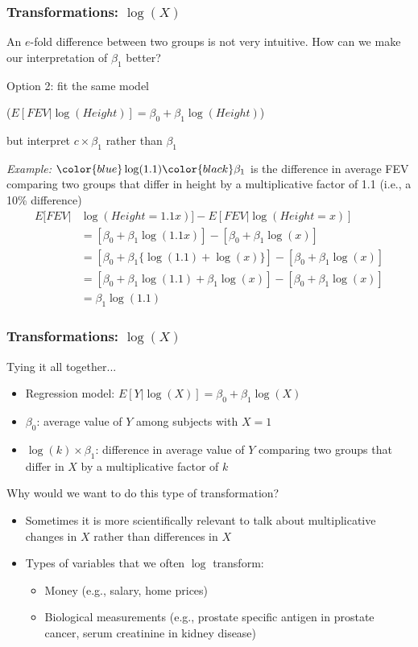 \documentclass[12pt, 
hyperref={colorlinks=true, linkcolor=blue, urlcolor=cyan}]{beamer}
\begin{document}
\begin{frame}
\frametitle{Transformations: $\log(X)$}
An $e$-fold difference between two groups is not very intuitive. How can we make our interpretation of $\beta_1$ better?

Option 2: fit the same model \begin{scriptsize}($E[FEV|\log(Height)] = \beta_0 + \beta_1\log(Height)$)\end{scriptsize} but interpret $c \times \beta_1$ rather than $\beta_1$ \pause

\textit{Example:} $\color{blue}\log(1.1)\color{black}\beta_1$ is the difference in average FEV comparing two groups that differ in height by a \color{blue}multiplicative factor of 1.1 \color{black} (i.e., a 10\% difference)\pause
	\begin{align*}
	E[FEV|&\log(Height=1.1x)]-E[FEV|\log(Height=x)] \\
	& = \left[\beta_0 + \beta_1\log(1.1x)\right] - \left[\beta_0 + \beta_1 \log(x) \right]\\
	& = \left[\beta_0 + \beta_1\{\log(1.1)+\log(x)\}\right] - \left[\beta_0 + \beta_1 \log(x) \right]\\
	& = \left[\beta_0 + \beta_1\log(1.1)+\beta_1\log(x)\right]-\left[\beta_0 + \beta_1 \log(x) \right]\\
	& = \beta_1\log(1.1)
	\end{align*}
\end{frame}

\begin{frame}
\frametitle{Transformations: $\log(X)$}
Tying it all together...
\begin{itemize}
\item \color{blue} Regression model: \color{black} $E[Y|\log(X)] = \beta_0 + \beta_1\log(X)$
\item \color{blue} $\beta_0$: \color{black} average value of $Y$ among subjects with $X = 1$
\item \color{blue} $\log(k)\times\beta_1$: \color{black} difference in average value of $Y$ comparing two groups that differ in $X$ by a multiplicative factor of $k$
\end{itemize}\pause

Why would we want to do this type of transformation?
\begin{itemize}
\item Sometimes it is more scientifically relevant to talk about multiplicative changes in $X$ rather than differences in $X$
\item Types of variables that we often $\log$ transform:
	\begin{itemize}
	\item Money (e.g., salary, home prices)
	\item Biological measurements (e.g., prostate specific antigen in prostate cancer, serum creatinine in kidney disease)
	\end{itemize}
\end{itemize}
\end{frame}
\end{document}
